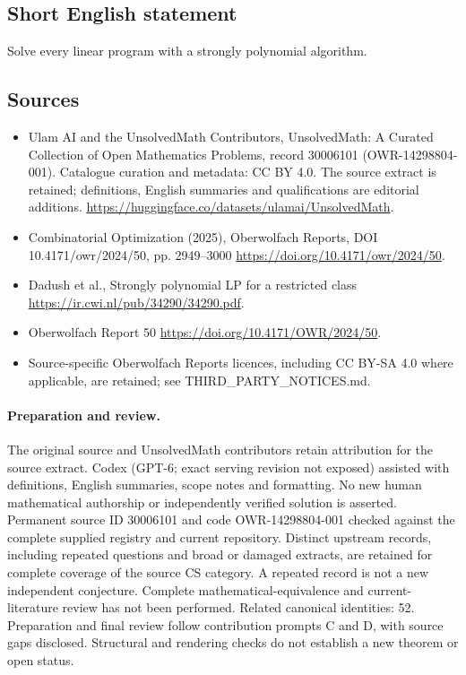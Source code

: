 \documentclass[11pt]{article}
\begin{document}
\subsection{Short English statement}
Solve every linear program with a strongly polynomial algorithm.
\subsection{Sources}
\begin{itemize}
\item[\hypertarget{source:30006101:1}{S1}] Ulam AI and the UnsolvedMath Contributors, UnsolvedMath: A Curated Collection of Open Mathematics Problems, record 30006101 (OWR-14298804-001). Catalogue curation and metadata: CC BY 4.0. The source extract is retained; definitions, English summaries and qualifications are editorial additions.
\url{https://huggingface.co/datasets/ulamai/UnsolvedMath}.
\item[\hypertarget{source:30006101:2}{S2}] Combinatorial Optimization (2025), Oberwolfach Reports, DOI 10.4171/owr/2024/50, pp. 2949--3000
\url{https://doi.org/10.4171/owr/2024/50}.
\item[\hypertarget{source:30006101:3}{S3}] Dadush et al., Strongly polynomial LP for a restricted class
\url{https://ir.cwi.nl/pub/34290/34290.pdf}.
\item[\hypertarget{source:30006101:4}{S4}] Oberwolfach Report 50
\url{https://doi.org/10.4171/OWR/2024/50}.
\item Source-specific Oberwolfach Reports licences, including CC BY-SA 4.0 where applicable, are retained; see THIRD\_PARTY\_NOTICES.md.
\end{itemize}
\paragraph{Preparation and review.}
The original source and UnsolvedMath contributors retain attribution for the source extract. Codex (GPT-6; exact serving revision not exposed) assisted with definitions, English summaries, scope notes and formatting. No new human mathematical authorship or independently verified solution is asserted. Permanent source ID 30006101 and code OWR-14298804-001 checked against the complete supplied registry and current repository. Distinct upstream records, including repeated questions and broad or damaged extracts, are retained for complete coverage of the source CS category. A repeated record is not a new independent conjecture. Complete mathematical-equivalence and current-literature review has not been performed. Related canonical identities: 52. Preparation and final review follow contribution prompts C and D, with source gaps disclosed. Structural and rendering checks do not establish a new theorem or open status.
\label{end:30006101}
\end{document}
